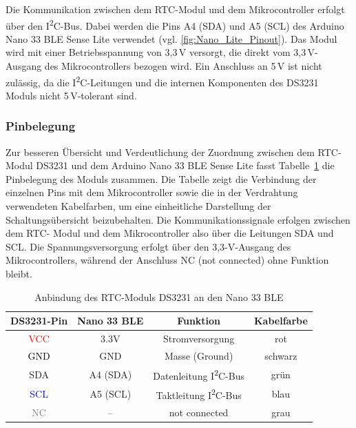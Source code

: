 Die Kommunikation zwischen dem RTC-Modul und dem Mikrocontroller erfolgt über den I\textsuperscript{2}C-Bus. 
Dabei werden die Pins A4 (SDA) und A5 (SCL) des Arduino Nano 33 BLE Sense Lite verwendet (vgl. \ref{fig:Nano_Lite_Pinout}). 
Das Modul wird mit einer Betriebsspannung von 3{,}3\,V versorgt, 
die direkt vom 3{,}3\,V-Ausgang des Mikrocontrollers bezogen wird. 
Ein Anschluss an 5\,V ist nicht zulässig, da die I\textsuperscript{2}C-Leitungen und die internen Komponenten 
des DS3231 Moduls nicht 5\,V-tolerant sind. 
\cite{MaximIntegrated:2023}


\subsubsection{Pinbelegung}

\medskip
\noindent

Zur besseren Übersicht und Verdeutlichung der Zuordnung zwischen dem RTC-Modul DS3231 
und dem Arduino Nano 33 BLE Sense Lite fasst Tabelle~\ref{tab:ds3231_arduino} 
die Pinbelegung des Moduls zusammen. 
Die Tabelle zeigt die Verbindung der einzelnen Pins mit dem Mikrocontroller 
sowie die in der Verdrahtung verwendeten Kabelfarben, 
um eine einheitliche Darstellung der Schaltungsübersicht beizubehalten. Die Kommunikationssignale erfolgen zwischen dem RTC- Modul und dem Mikrocontroller also über die Leitungen SDA und SCL. Die Spannungsversorgung erfolgt über den 3,3-V-Ausgang des Mikrocontrollers, 
während der Anschluss NC (not connected) ohne Funktion bleibt.


\begin{table}[H]
	\centering
	\renewcommand{\arraystretch}{1.2}
	\begin{tabular}{|c|c|c|c|}
		\hline
		\textbf{DS3231-Pin} & \textbf{Nano 33 BLE} & \textbf{Funktion} & \textbf{Kabelfarbe} \\
		\hline
		\textcolor{red}{VCC} & 3.3V & Stromversorgung & \cellcolor{red!20}rot \\
		\hline
		\textcolor{black}{GND} & GND & Masse (Ground) & \cellcolor{black!10}schwarz \\
		\hline
		\textcolor{green!50!black}{SDA} & A4 (SDA) & Datenleitung I\textsuperscript{2}C-Bus & \cellcolor{green!20}grün \\
		\hline
		\textcolor{blue}{SCL} & A5 (SCL) & Taktleitung I\textsuperscript{2}C-Bus & \cellcolor{blue!20}blau \\
		\hline
		\textcolor{gray}{NC} & -- & not connected & \cellcolor{gray!10}grau \\
		\hline
	\end{tabular}
	\caption{Anbindung des RTC-Moduls DS3231 an den Nano 33 BLE }\label{tab:ds3231_arduino}
\end{table}


